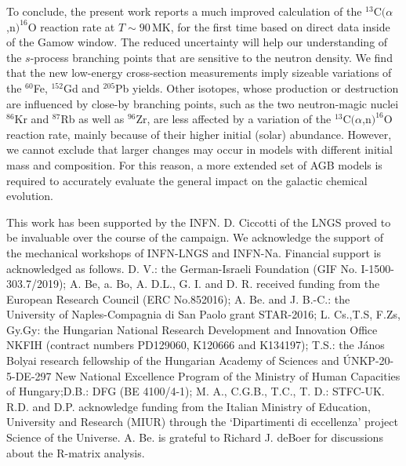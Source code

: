 \documentclass[%
reprint,
groupedaddress,
showpacs,
nofootinbib,
amsmath,amssymb,
aps,
prl,
superscriptaddress,
notitlepage,
floatfix
]{revtex4-2}
\begin{document}
To conclude, the present work reports a much improved calculation of the $^{13}$C$(\alpha$,n$)^{16}$O reaction rate at $T\sim 90$\,MK, for the first time based on direct data inside of the Gamow window. The reduced uncertainty will help our understanding of the $s$-process branching points that are sensitive to the neutron density. We find that the new low-energy cross-section measurements imply sizeable variations of the $^{60}$Fe, $^{152}$Gd and $^{205}$Pb yields. Other isotopes, whose production or destruction are influenced by close-by branching points, such as the two neutron-magic nuclei $^{86}$Kr and $^{87}$Rb as well as $^{96}$Zr, are less affected by a variation of the $^{13}$C$(\alpha$,n$)^{16}$O reaction rate,  mainly because of their higher initial (solar) abundance. However, we cannot exclude that larger changes may occur in models with different initial mass and composition. For this reason, a more extended set of AGB models is required to accurately evaluate the general impact on the galactic chemical evolution.

\begin{acknowledgments}
This work has been supported by the INFN. D. Ciccotti of the LNGS proved to be invaluable over the  course of the campaign. We acknowledge the support of the mechanical workshops of INFN-LNGS and INFN-Na. Financial support is acknowledged as follows. D. V.: the German-Israeli Foundation (GIF No. I-1500-303.7/2019); A. Be, a. Bo, A. D.L., G. I. and D. R. received funding from the European Research Council (ERC No.852016); A. Be. and J. B.-C.: the University of Naples-Compagnia di San Paolo grant STAR-2016; L. Cs.,T.S, F.Zs, Gy.Gy: the Hungarian National Research Development and Innovation Office NKFIH (contract numbers PD129060, K120666 and K134197); T.S.: the János Bolyai research fellowship of the Hungarian Academy of Sciences and ÚNKP-20-5-DE-297 New National Excellence Program of the Ministry of Human Capacities of Hungary;D.B.: DFG (BE 4100/4-1); M. A., C.G.B., T.C., T. D.: STFC-UK. R.D. and D.P. acknowledge funding from the Italian Ministry of Education, University and Research (MIUR) through the ‘Dipartimenti di eccellenza’ project Science of the Universe. A. Be. is grateful to Richard J. deBoer for discussions about the R-matrix analysis.
\end{acknowledgments}

%

\end{document}

